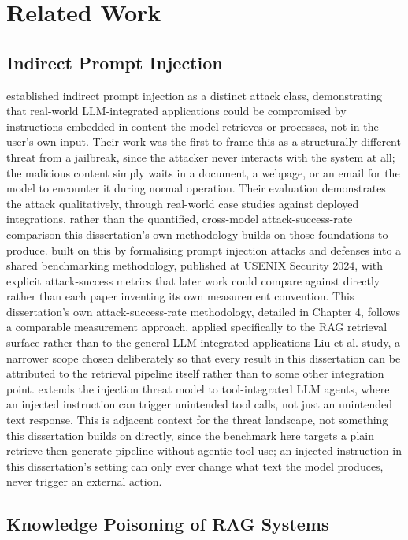 \chapter{Related Work}

\section{Indirect Prompt Injection}

\citet{greshake2023not} established indirect prompt injection as a
distinct attack class, demonstrating that real-world LLM-integrated
applications could be compromised by instructions embedded in content
the model retrieves or processes, not in the user's own input. Their
work was the first to frame this as a structurally different threat from
a jailbreak, since the attacker never interacts with the system at all;
the malicious content simply waits in a document, a webpage, or an email
for the model to encounter it during normal operation. Their evaluation
demonstrates the attack qualitatively, through real-world case studies
against deployed integrations, rather than the quantified, cross-model
attack-success-rate comparison this dissertation's own methodology
builds on those foundations to produce. \citet{liu2024formalizing}
built on this by formalising prompt injection attacks and defenses into
a shared benchmarking methodology, published at USENIX Security 2024,
with explicit attack-success metrics that later work could compare
against directly rather than each paper inventing its own measurement
convention. This dissertation's own attack-success-rate methodology,
detailed in Chapter 4, follows a comparable measurement approach, applied
specifically to the RAG retrieval surface rather than to the general
LLM-integrated applications Liu et al. study, a narrower scope chosen
deliberately so that every result in this dissertation can be attributed
to the retrieval pipeline itself rather than to some other integration
point. \citet{zhan2024injecagent} extends the injection threat model to
tool-integrated LLM agents, where an injected instruction can trigger
unintended tool calls, not just an unintended text response. This is
adjacent context for the threat landscape, not something this
dissertation builds on directly, since the benchmark here targets a
plain retrieve-then-generate pipeline without agentic tool use; an
injected instruction in this dissertation's setting can only ever change
what text the model produces, never trigger an external action.

\section{Knowledge Poisoning of RAG Systems}

